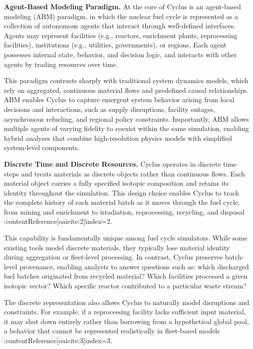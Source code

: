 \textbf{Agent-Based Modeling Paradigm.}  
At the core of Cyclus is an agent-based modeling (ABM) paradigm, in which the nuclear fuel cycle is represented as a collection 
of autonomous agents that interact through well-defined interfaces. Agents may represent facilities (e.g., reactors, enrichment 
plants, reprocessing facilities), institutions (e.g., utilities, governments), or regions. Each agent possesses internal state, 
behavior, and decision logic, and interacts with other agents by trading resources over time.

This paradigm contrasts sharply with traditional system dynamics models, which rely on aggregated, continuous material flows and 
predefined causal relationships. ABM enables Cyclus to capture emergent system behavior arising from local decisions and 
interactions, such as supply disruptions, facility outages, asynchronous refueling, and regional policy constraints. 
Importantly, ABM allows multiple agents of varying fidelity to coexist within the same simulation, enabling hybrid analyses 
that combine high-resolution physics models with simplified system-level components.

\textbf{Discrete Time and Discrete Resources.}  
Cyclus operates in discrete time steps and treats materials as discrete objects rather than continuous flows. 
Each material object carries a fully specified isotopic composition and retains its identity throughout the simulation. 
This design choice enables Cyclus to track the complete history of each material batch as it moves through the fuel cycle, 
from mining and enrichment to irradiation, reprocessing, recycling, and disposal :contentReference[oaicite:2]{index=2}.

This capability is fundamentally unique among fuel cycle simulators. While some existing tools model discrete materials, 
they typically lose material identity during aggregation or fleet-level processing. In contrast, Cyclus preserves batch-level 
provenance, enabling analysts to answer questions such as: which discharged fuel batches originated from recycled material? 
Which facilities processed a given isotopic vector? Which specific reactor contributed to a particular waste stream?

The discrete representation also allows Cyclus to naturally model disruptions and constraints. For example, if a reprocessing 
facility lacks sufficient input material, it may shut down entirely rather than borrowing from a hypothetical global pool, a 
behavior that cannot be represented realistically in fleet-based models :contentReference[oaicite:3]{index=3}.

